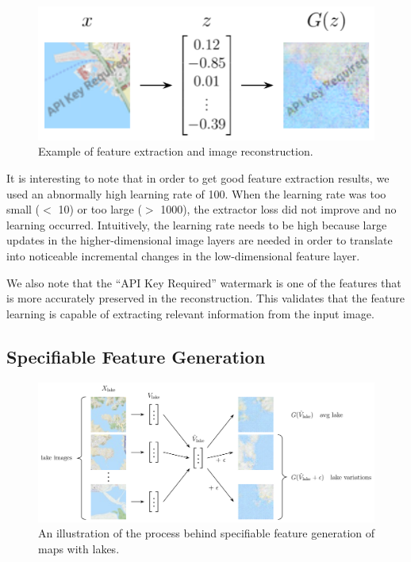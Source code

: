 \documentclass[11pt,twocolumn,letterpaper]{article}
\begin{document}
\begin{figure}[H]
    \centering
        \includegraphics[width=\linewidth]{imgs/feature.png}
        \caption{Example of feature extraction and image reconstruction.}
        \label{fig:feature}
\end{figure}

It is interesting to note that in order to get good feature extraction results, we used an abnormally high learning rate of 100. When the learning rate was too small ($<$ 10) or too large ($>$ 1000), the extractor loss did not improve and no learning occurred. Intuitively, the learning rate needs to be high because large updates in the higher-dimensional image layers are needed in order to translate into noticeable incremental changes in the low-dimensional feature layer.

We also note that the ``API Key Required'' watermark is one of the features that is more accurately preserved in the reconstruction. This validates that the feature learning is capable of extracting relevant information from the input image.

\subsection{Specifiable Feature Generation}

\begin{figure}[ht]
    \centering
    \includegraphics[width=0.95\linewidth]{imgs/lake.png}
    \caption{An illustration of the process behind specifiable feature generation of maps with lakes.}
  \label{fig:lake}
\end{figure}
\end{document}
